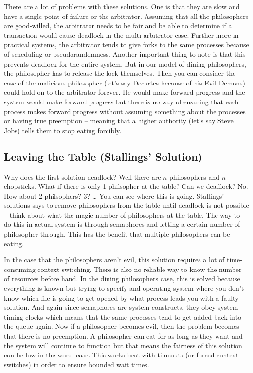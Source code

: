There are a lot of problems with these solutions. One is that they are slow and have a single point of failure or the arbitrator. Assuming that all the philosophers are good-willed, the arbitrator needs to be fair and be able to determine if a transaction would cause deadlock in the multi-arbitrator case. Further more in practical systems, the arbitrator tends to give forks to the same processes because of scheduling or pseudorandomness. Another important thing to note is that this prevents deadlock for the entire system. But in our model of dining philosophers, the philosopher has to release the lock themselves. Then you can consider the case of the malicious philosopher (let's say Decartes because of his Evil Demons) could hold on to the arbitrator forever. He would make forward progress and the system would make forward progress but there is no way of ensuring that each process makes forward progress without assuming something about the processes or having true preemption -- meaning that a higher authority (let's say Steve Jobs) tells them to stop eating forcibly.

\subsection{Leaving the Table (Stallings' Solution)}

Why does the first solution deadlock? Well there are $n$ philosophers and $n$ chopsticks. What if there is only 1 philsopher at the table? Can we deadlock? No. How about 2 philsophers? 3? \ldots{} You can see where this is going. Stallings' \cite{CITATION_NEEDED} solutions says to remove philosophers from the table until deadlock is not possible -- think about what the magic number of philosophers at the table. The way to do this in actual system is through semaphores and letting a certain number of philosopher through. This has the benefit that multiple philosophers can be eating.

In the case that the philosophers aren't evil, this solution requires a lot of time-consuming context switching. There is also no reliable way to know the number of resources before hand. In the dining philosophers case, this is solved because everything is known but trying to specify and operating system where you don't know which file is going to get opened by what process leads you with a faulty solution. And again since semaphores are system constructs, they obey system timing clocks which means that the same processes tend to get added back into the queue again. Now if a philosopher becomes evil, then the problem becomes that there is no preemption. A philosopher can eat for as long as they want and the system will continue to function but that means the fairness of this solution can be low in the worst case. This works best with timeouts (or forced context switches) in order to ensure bounded wait times.

